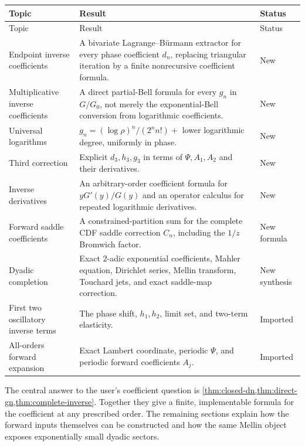 \documentclass[11pt,oneside]{article}
\numberwithin{equation}{section}
\theoremstyle{definition}
\theoremstyle{remark}
\begin{document}
\begin{longtable}{@{}p{}p{}p{}@{}}
\toprule
Topic & Result & Status\\
\midrule
\endfirsthead
\toprule
Topic & Result & Status\\
\midrule
\endhead
Endpoint inverse coefficients & A bivariate Lagrange--Bürmann extractor for every phase coefficient $d_n$, replacing triangular iteration by a finite nonrecursive coefficient formula. & New\\
Multiplicative inverse coefficients & A direct partial-Bell formula for every $g_n$ in $G/G_0$, not merely the exponential-Bell conversion from logarithmic coefficients. & New\\
Universal logarithms & $g_n=(\log\rho)^n/(2^nn!)+$ lower logarithmic degree, uniformly in phase. & New\\
Third correction & Explicit $d_3,h_3,g_3$ in terms of $\Psi,A_1,A_2$ and their derivatives. & New\\
Inverse derivatives & An arbitrary-order coefficient formula for $yG'(y)/G(y)$ and an operator calculus for repeated logarithmic derivatives. & New\\
Forward saddle coefficients & A constrained-partition sum for the complete CDF saddle correction $C_n$, including the $1/z$ Bromwich factor. & New formula\\
Dyadic completion & Exact $2$-adic exponential coefficients, Mahler equation, Dirichlet series, Mellin transform, Touchard jets, and exact saddle-map correction. & New synthesis\\
First two oscillatory inverse terms & The phase shift, $h_1,h_2$, limit set, and two-term elasticity. & Imported\\
All-orders forward expansion & Exact Lambert coordinate, periodic $\Psi$, and periodic forward coefficients $A_j$. & Imported\\
\bottomrule
\end{longtable}

\begin{resultbox}
The central answer to the user's coefficient question is
\cref{thm:closed-dn,thm:direct-gn,thm:complete-inverse}.  Together they give a
finite, implementable formula for the coefficient at any prescribed order.
The remaining sections explain how the forward inputs themselves can be
constructed and how the same Mellin object exposes exponentially small dyadic
sectors.
\end{resultbox}
\end{document}
